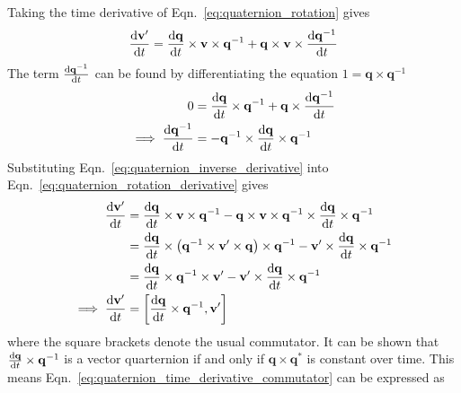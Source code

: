 Taking the time derivative of Eqn.~\ref{eq:quaternion_rotation} gives
\begin{equation}
    \frac{\textrm{d}\mathbf{v}'}{\textrm{d} t} = \frac{\textrm{d}\mathbf{q}}{\textrm{d} t} \times \mathbf{v} \times \mathbf{q}^{-1}
    + \mathbf{q} \times \mathbf{v} \times \frac{\textrm{d}\mathbf{q}^{-1}}{\textrm{d} t}\label{eq:quaternion_rotation_derivative}
\end{equation}
The term \( \frac{\textrm{d}\mathbf{q}^{-1}}{\textrm{d} t} \) can be found by differentiating the equation \( 1 = \mathbf{q} \times \mathbf{q}^{-1} \)
\begin{align}
    0
     & = \frac{\textrm{d}\mathbf{q}}{\textrm{d} t} \times \mathbf{q}^{-1} + \mathbf{q} \times \frac{\textrm{d}\mathbf{q}^{-1}}{\textrm{d} t} \nonumber          \\
    \implies \frac{\textrm{d}\mathbf{q}^{-1}}{\textrm{d} t}
     & = -\mathbf{q}^{-1} \times \frac{\textrm{d}\mathbf{q}}{\textrm{d} t} \times \mathbf{q}^{-1} \label{eq:quaternion_inverse_derivative}
\end{align}
Substituting Eqn.~\ref{eq:quaternion_inverse_derivative} into Eqn.~\ref{eq:quaternion_rotation_derivative} gives
\begin{align}
    \frac{\textrm{d}\mathbf{v}'}{\textrm{d} t}
                                   & = \frac{\textrm{d}\mathbf{q}}{\textrm{d} t} \times \mathbf{v} \times \mathbf{q}^{-1}
    - \mathbf{q} \times \mathbf{v} \times \mathbf{q}^{-1} \times \frac{\textrm{d}\mathbf{q}}{\textrm{d} t} \times \mathbf{q}^{-1} \nonumber                                      \\
                                   & = \frac{\textrm{d}\mathbf{q}}{\textrm{d} t} \times \left(\mathbf{q}^{-1} \times \mathbf{v}' \times \mathbf{q}\right) \times \mathbf{q}^{-1}
    - \mathbf{v}' \times \frac{\textrm{d}\mathbf{q}}{\textrm{d} t} \times \mathbf{q}^{-1} \nonumber                                                                              \\
                                   & = \frac{\textrm{d}\mathbf{q}}{\textrm{d} t} \times \mathbf{q}^{-1} \times \mathbf{v}'
    - \mathbf{v}' \times \frac{\textrm{d}\mathbf{q}}{\textrm{d} t} \times \mathbf{q}^{-1} \nonumber                                                                              \\
    \implies \frac{\textrm{d}\mathbf{v}'}{\textrm{d} t} & = \left[\frac{\textrm{d}\mathbf{q}}{\textrm{d} t}\times\mathbf{q}^{-1}, \mathbf{v}'\right]\label{eq:quaternion_time_derivative_commutator}
\end{align}
where the square brackets denote the usual commutator. It can be shown that \( \frac{\textrm{d}\mathbf{q}}{\textrm{d} t}\times\mathbf{q}^{-1} \) is a
vector quarternion if and only if \( \mathbf{q} \times \mathbf{q}^{*} \) is constant over time. This means
Eqn.~\ref{eq:quaternion_time_derivative_commutator} can be expressed as
